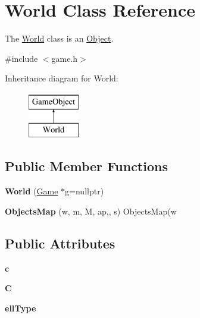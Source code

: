 \hypertarget{class_world}{\section{\-World \-Class \-Reference}
\label{class_world}
}


\-The \hyperlink{class_world}{\-World} class is an \hyperlink{class_object}{\-Object}.  




{\ttfamily \#include $<$game.\-h$>$}

\-Inheritance diagram for \-World\-:\begin{figure}[H]
\begin{center}
\leavevmode
\includegraphics[height=2.000000cm]{class_world}
\end{center}
\end{figure}
\subsection*{\-Public \-Member \-Functions}
\begin{DoxyCompactItemize}
\item 
\hypertarget{class_world_aa98c729f0ebcc07044dacd0964331a2f}{{\bfseries \-World} (\hyperlink{class_game}{\-Game} $\ast$g=nullptr)}\label{class_world_aa98c729f0ebcc07044dacd0964331a2f}

\item 
\hypertarget{class_world_a79952636a098cfdcc6b3ddbee67185b9}{{\bfseries \-Objects\-Map} (w, m, \-M, ap,, s) \-Objects\-Map(w}\label{class_world_a79952636a098cfdcc6b3ddbee67185b9}

\end{DoxyCompactItemize}
\subsection*{\-Public \-Attributes}
\begin{DoxyCompactItemize}
\item 
\hypertarget{class_world_a2d14b2692a62032da823acb06108dbdf}{{\bfseries c}}\label{class_world_a2d14b2692a62032da823acb06108dbdf}

\item 
\hypertarget{class_world_a7c409ebd3438d9a71ef27712f0720305}{{\bfseries \-C}}\label{class_world_a7c409ebd3438d9a71ef27712f0720305}

\item 
\hypertarget{class_world_a80a5d037d5c7040a80c225a4780ea322}{{\bfseries ell\-Type}}\label{class_world_a80a5d037d5c7040a80c225a4780ea322}

\end{DoxyCompactItemize}


